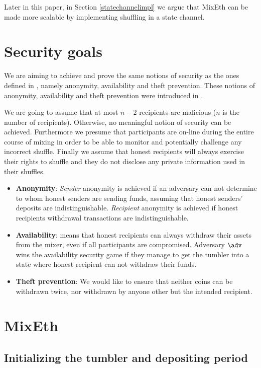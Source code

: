 \documentclass[a4paper]{article}
\theoremstyle{definition}
\begin{document}
Later in this paper, in Section \ref{statechannelimpl} we argue that MixEth can be made more scalable by implementing shuffling in a state channel.   

\section{Security goals} \label{securitygoals}
We are aiming to achieve and prove the same notions of security as the ones defined in \cite{meiklejohn2018mobius}, namely anonymity, availability and theft prevention. These notions of anonymity, availability and theft prevention were introduced in \cite{meiklejohn2018mobius}.

We are going to assume that at most $n-2$ recipients are malicious ($n$ is the number of recipients). Otherwise, no meaningful notion of security can be achieved. Furthermore we presume that participants are on-line during the entire course of mixing in order to be able to monitor and potentially challenge any incorrect shuffle. Finally we assume that honest recipients will always exercise their rights to shuffle and they do not disclose any private information used in their shuffles.

\begin{itemize}
	\item \textbf{Anonymity}: \textit{Sender} anonymity is achieved if an adversary can not determine to whom honest senders are sending funds, assuming that honest senders' deposits are indistinguishable. \textit{Recipient} anonymity is achieved if honest recipients withdrawal transactions are indistinguishable. 
	\item \textbf{Availability}: means that honest recipients can always withdraw their assets from the mixer, even if all participants are compromised. Adversary $\adv$ wins the availability security game if they manage to get the tumbler into a state where honest recipient can not withdraw their funds.
	\item \textbf{Theft prevention}: We would like to ensure that neither coins can be withdrawn twice, nor withdrawn by anyone other but the intended recipient.
\end{itemize}


 
\section{MixEth}
\subsection{Initializing the tumbler and depositing period}
\end{document}

